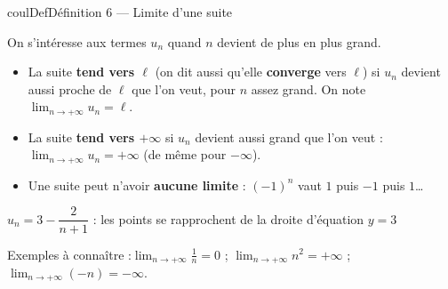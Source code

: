 \documentclass[11pt,a4paper]{article}
\makeatletter
\newcommand{\lycee@gradx}[1]{\foreach \k/\l in {#1}{%
  \draw (\k,0.07)--(\k,-0.07) node[below,font=\scriptsize,inner sep=1.5pt]{$\l$};}}
\newcommand{\lycee@grady}[1]{\foreach \k/\l in {#1}{%
  \draw (0.07,\k)--(-0.07,\k) node[left,font=\scriptsize,inner sep=1.5pt]{$\l$};}}
\providecommand{\gradx}{\lycee@gradx}%
\providecommand{\grady}{\lycee@grady}%
\newcounter{lycee@signet}
\newcommand{\signet}[3][]{\stepcounter{lycee@signet}%
  \edef\lycee@dest{\if\relax\detokenize{#1}\relax
    signet.\arabic{lycee@signet}\else#1\fi}%
  \hypertarget{\lycee@dest}{}\bookmark[level=#2,dest=\lycee@dest]{#3}}
\newenvironment{definitionbox}[1][Définition]%
  {\begin{boitecours}[phantom={\signet{2}{#1}}]{coulDef}{#1}}{\end{boitecours}}
\makeatother
\begin{document}
\begin{definitionbox}[Définition 6 --- Limite d'une suite]
\begin{minipage}[c]{0.58\linewidth}\raggedright
On s'intéresse aux termes $u_{n}$ quand $n$ devient de plus en plus grand.
\begin{itemize}
  \item La suite \textbf{tend vers $\ell$} (on dit aussi qu'elle \textbf{converge} vers
        $\ell$) si $u_{n}$ devient aussi proche de $\ell$ que l'on veut, pour $n$ assez
        grand. On note $\displaystyle\lim_{n\to+\infty}u_{n}=\ell$.
  \item La suite \textbf{tend vers $+\infty$} si $u_{n}$ devient aussi grand que l'on
        veut : $\displaystyle\lim_{n\to+\infty}u_{n}=+\infty$ (de même pour $-\infty$).
  \item Une suite peut n'avoir \textbf{aucune limite} : $(-1)^{n}$ vaut $1$ puis $-1$
        puis $1$\dots
\end{itemize}
\end{minipage}\hfill
\begin{minipage}[c]{0.38\linewidth}\centering
{}

\smallskip
{\footnotesize $u_{n}=3-\dfrac{2}{n+1}$ : les points se rapprochent de la droite
d'équation $y=3$}
\end{minipage}

\medskip
Exemples à connaître :\quad $\displaystyle\lim_{n\to+\infty}\frac{1}{n}=0$ \;;\quad
$\displaystyle\lim_{n\to+\infty}n^{2}=+\infty$ \;;\quad
$\displaystyle\lim_{n\to+\infty}(-n)=-\infty$.
\end{definitionbox}
\end{document}
